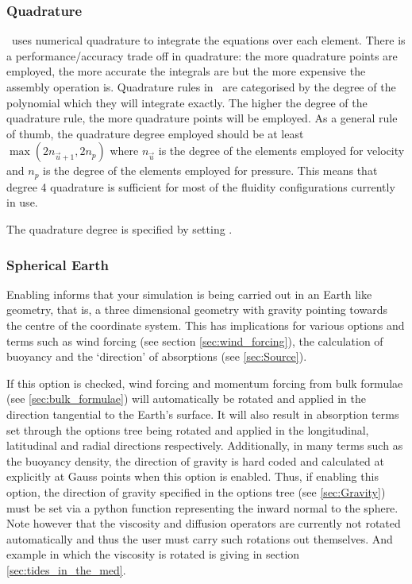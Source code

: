 \subsubsection{Quadrature}
\fluidity\ uses numerical quadrature to integrate the equations over each
element. There is a performance/accuracy trade off in quadrature: the more
quadrature points are employed, the more accurate the integrals are but
the more expensive the assembly operation is. Quadrature rules in \fluidity\ are categorised by the degree of the polynomial which they will integrate
exactly. The higher the degree of the quadrature rule, the more quadrature
points will be employed. As a general rule of thumb, the quadrature
degree employed should be at least $\max(2n_{\vec{u}+1},2n_p)$ where
$n_{\vec{u}}$ is the degree of the elements employed for velocity and $n_p$
is the degree of the elements employed for pressure. This means that degree
4 quadrature is sufficient for most of the fluidity configurations currently
in use.

The quadrature degree is specified by setting .

\subsubsection{Spherical Earth}

Enabling  informs \fluidity that your simulation is being carried out in an Earth like geometry, that is, a three dimensional geometry with gravity pointing towards the centre of the coordinate system. This has implications for various options and terms such as wind forcing (see section \ref{sec:wind_forcing}), the calculation of buoyancy and the `direction' of absorptions (see \ref{sec:Source}).

If this option is checked, wind forcing and \eg momentum forcing from bulk formulae (see \ref{sec:bulk_formulae}) will automatically be rotated and applied in the direction tangential to the Earth's surface. It will also result in absorption terms set through the options tree being rotated and applied in the longitudinal, latitudinal and radial directions respectively. Additionally, in many terms such as the buoyancy density, the direction of gravity is hard coded and calculated at explicitly at Gauss points when this option is enabled. Thus, if enabling this option, the direction of gravity specified in the options tree (see \ref{sec:Gravity}) must be set via a python function representing the inward normal to the sphere. Note however that the viscosity and diffusion operators are currently not rotated automatically and thus the user must carry such rotations out themselves. And example in which the viscosity is rotated is giving in section \ref{sec:tides_in_the_med}.

